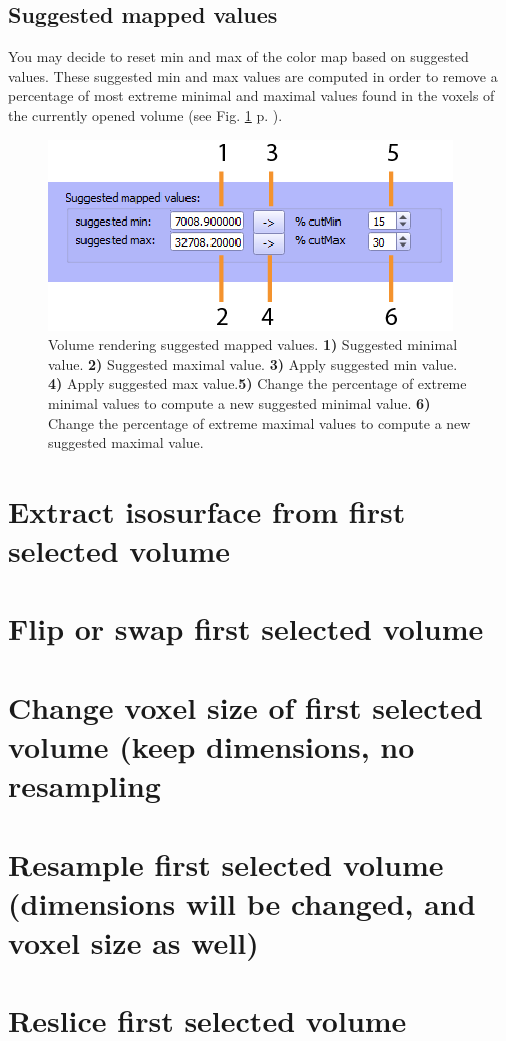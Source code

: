 \subsection{Suggested mapped values}
You may decide to reset min and max of the color map based on suggested values. These suggested min and max values are computed in order to remove a percentage of most extreme minimal and maximal values found in the voxels of the currently opened volume (see Fig. \ref{volume_suggested_values} p. \pageref{volume_suggested_values}).
\begin{figure}
  \centering
  \includegraphics[scale=1]{images/14/volume_suggested_values2.png}
\caption{Volume rendering suggested mapped values. \textbf{1)} Suggested minimal value. \textbf{2)} Suggested maximal value. \textbf{3)} Apply suggested min value.  \textbf{4)} Apply suggested max value.\textbf{5)} Change the percentage of extreme minimal values to compute a new suggested minimal value. \textbf{6)} Change the percentage of extreme maximal values to compute a new suggested maximal value.}	
\label{volume_suggested_values}
 \end{figure}


\section{Extract isosurface from first selected volume}

\section{Flip or swap first selected volume}

\section{Change voxel size of first selected volume (keep dimensions, no resampling}

\section{Resample first selected volume (dimensions will be changed, and voxel size as well)}

\section{Reslice first selected volume}


